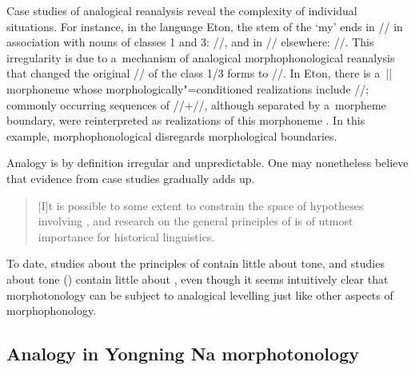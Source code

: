 Case studies of analogical reanalysis reveal the complexity of individual situations. For
instance, in the  language Eton, the stem of the  ‘my’ ends in
// in association with nouns of classes 1 and 3: //, and in // elsewhere: //. This
irregularity is due to a~mechanism of analogical morphophonological reanalysis that changed the
original // of the class 1/3 forms to //. In Eton, there is a~|| morphoneme whose
morphologically"=conditioned realizations include //; commonly occurring
sequences of //+//, although separated by a~morpheme {boundary}, were reinterpreted as
realizations of this morphoneme \citep{vandevelde2008}. In this example, morphophonological
 disregards morphological boundaries. %

Analogy is by definition irregular and unpredictable. One may nonetheless believe that evidence from case studies gradually adds up.

\begin{quotation}
	[I]t is possible to some extent
	to constrain the space of hypotheses involving , and research
	on the general principles of  is of utmost importance for historical
	linguistics. \citep[239]{jacques2016}
\end{quotation}

To date, studies about the principles of  \citep[e.g.][]{kurylowicz1944, lahiri2000, hill2007, blevinsetal2009, juge2013, hill2014} contain little about tone, and studies about tone (\cites[e.g.][]{pike1948}{fromkinTONE1978}{pulleyblank1986}[229-231]{gussenhoven2004}) contain little about , even though it seems intuitively clear that morphotonology can be subject to analogical levelling just like other aspects of morphophonology. 


\subsection{Analogy in Yongning Na morphotonology}
\label{sec:applicationtoyongningna}

